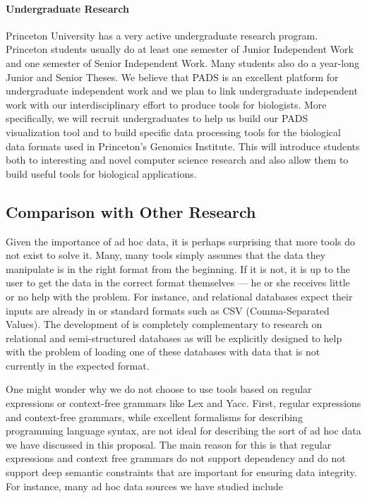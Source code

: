 \documentclass[11pt]{article}
\begin{document}
\paragraph*{Undergraduate Research}
Princeton University has a very active undergraduate research program.
Princeton students usually do at least one semester of
Junior Independent Work and one semester of Senior Independent Work. 
Many students also do a year-long
Junior and Senior Theses.  We believe that PADS is an excellent
platform for undergraduate independent work and we plan to link
undergraduate independent work with our interdisciplinary effort to
produce tools for biologists.
More specifically, we will recruit undergraduates to help us
build our PADS visualization tool and to build
specific data processing tools for the biological data formats
used in Princeton's Genomics Institute.
This will introduce students both to interesting and novel
computer science research and also allow them to build useful
tools for biological applications. 

\subsection{Comparison with Other Research}
\label{ssec:related}

Given the importance of ad hoc data, it is perhaps surprising that
more tools do not exist to solve it.  Many, many tools simply
assumes that the data they manipulate is in the right format
from the beginning.  If it is not, it is up to the user
to get the data in the correct format themselves --- he or she receives 
little or no help with the problem. For instance, \xml{} and relational databases
expect their inputs are already in \xml{} or standard formats such as
CSV (Comma-Separated Values).  The development of \datatype{} is
completely complementary to research on relational and semi-structured databases
as \datatype will be explicitly designed
to help with the problem of loading one of these databases with data that
is not currently in the expected format.

One might wonder why we do not choose to use tools based on
regular expressions or context-free grammars like Lex and Yacc.
First, regular expressions and context-free grammars, while excellent
formalisms for describing programming language syntax, are not ideal
for describing the sort of ad hoc data we have discussed in this proposal.
The main reason for this is that regular expressions and context free grammars
do not support dependency and do not support deep semantic constraints
that are important for ensuring data integrity.
For instance, many ad hoc data sources we have studied include
 
\end{document}
